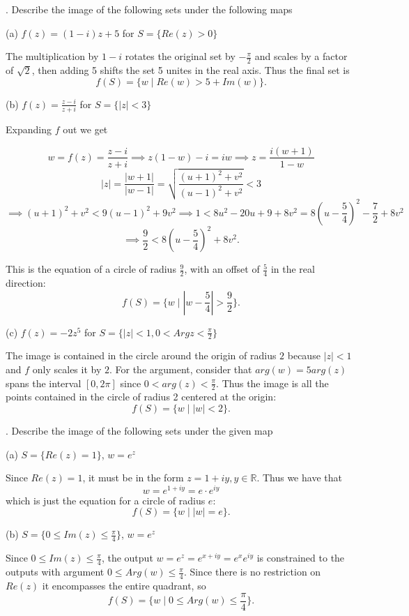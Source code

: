 \documentclass[letterpaper, reqno,11pt]{article}
\begin{document}
. Describe the image of the following sets under the following maps

(a) $ f(z)= (1-i) z+5$ for $ S=\{ Re (z)>0\}$

The multiplication by $1-i$ rotates the original set by $-\frac{\pi}{2}$ and scales by a factor of $ \sqrt{2} $, then adding 5 shifts the set 5 unites in the real axis. Thus the final set is
\[
f(S)=\{w\mid Re(w)>5+Im(w)\} 
.\]

(b) $ f(z)= \frac{z-i}{z+i}$ for $ S= \{ |z|<3 \}$

Expanding $f$ out we get 

\[
w=f(z)=\frac{z-i}{z+i}\implies z(1-w)-i=iw\implies z=\frac{i(w+1)}{1-w}%
\]
\[
|z|=\frac{|w+1|}{|w-1|}=\sqrt{\frac{(u+1)^2+v^2}{(u-1)^2+v^2}} < 3
\]
\[
\implies (u+1)^2+v^2<9(u-1)^2+9v^2\implies 1<8u^2-20u+9+8v^2=8\left(u-\frac{5}{4}\right)^2-\frac{7}{2}+8v^2
\]
\[
\implies \frac{9}{2}<8\left(u-\frac{5}{4}\right)^2+8v^2
.\]

This is the equation of a circle of radius $\frac{9}{2}$, with an offset of $\frac{5}{4}$ in the real direction: 
\[
f(S)=\{w\mid \left|w-\frac{5}{4}\right|>\frac{9}{2}\} 
.\]

(c) $ f(z)= -2 z^5$ for $ S= \{ |z|<1, 0<Arg z<\frac{\pi}{2} \}$

The image is contained in the circle around the origin of radius $2$ because $|z|<1$ and $f$ only scales it by $2$. For the argument, consider that $arg(w)=5arg(z)$ spans the interval $[0, 2\pi]$ since $0<arg(z)< \frac{\pi}{2}$. Thus the image is all the points contained in the circle of radius 2 centered at the origin: 
\[
f(S)=\{w\mid |w|<2\} 
.\]

\medskip

. Describe the image of the following sets under the given map

(a) $S= \{ Re (z)=1\}$, $w=e^z$

Since $Re(z)=1$, it must be in the form $z=1+iy, y\in\mathbb{R}$. Thus we have that 
 \[
w=e^{1+iy}=e\cdot e^{iy}
\]
which is just the equation for a circle of radius $e$: 
 \[
f(S)=\{w\mid |w|=e\} 
.\]

(b) $ S= \{ 0 \leq Im (z) \leq \frac{\pi}{4} \}$, $w=e^z$

Since $0\leq Im(z)\leq \frac{\pi}{4}$, the output $w=e^{z}=e^{x+iy}=e^xe^{iy}$ is constrained to the outputs with argument $0\leq Arg(w)\leq \frac{\pi}{4}$. Since there is no restriction on $Re(z)$ it encompasses the entire quadrant, so
\[
f(S)=\{w\mid 0\leq Arg(w)\leq \frac{\pi}{4}\} 
.\]
\end{document}

